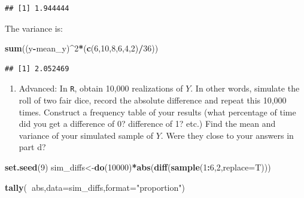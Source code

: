 \documentclass[
]{book}
\newenvironment{Shaded}{\begin{snugshade}}{\end{snugshade}}
\newcommand{\DataTypeTok}[1]{\textcolor[rgb]{0.13,0.29,0.53}{#1}}
\newcommand{\DecValTok}[1]{\textcolor[rgb]{0.00,0.00,0.81}{#1}}
\newcommand{\KeywordTok}[1]{\textcolor[rgb]{0.13,0.29,0.53}{\textbf{#1}}}
\newcommand{\NormalTok}[1]{#1}
\newcommand{\OperatorTok}[1]{\textcolor[rgb]{0.81,0.36,0.00}{\textbf{#1}}}
\newcommand{\StringTok}[1]{\textcolor[rgb]{0.31,0.60,0.02}{#1}}
\providecommand{\tightlist}{%
  \setlength{\itemsep}{0pt}\setlength{\parskip}{0pt}}
\begin{document}
\begin{verbatim}
## [1] 1.944444
\end{verbatim}

The variance is:

\begin{Shaded}
\begin{Highlighting}[]
\KeywordTok{sum}\NormalTok{((y}\OperatorTok{-}\NormalTok{mean_y)}\OperatorTok{^}\DecValTok{2}\OperatorTok{*}\NormalTok{(}\KeywordTok{c}\NormalTok{(}\DecValTok{6}\NormalTok{,}\DecValTok{10}\NormalTok{,}\DecValTok{8}\NormalTok{,}\DecValTok{6}\NormalTok{,}\DecValTok{4}\NormalTok{,}\DecValTok{2}\NormalTok{)}\OperatorTok{/}\DecValTok{36}\NormalTok{))}
\end{Highlighting}
\end{Shaded}

\begin{verbatim}
## [1] 2.052469
\end{verbatim}

\begin{enumerate}
\def\labelenumi{\alph{enumi}.}
\setcounter{enumi}{4}
\tightlist
\item
  Advanced: In \texttt{R}, obtain 10,000 realizations of \(Y\). In other words, simulate the roll of two fair dice, record the absolute difference and repeat this 10,000 times. Construct a frequency table of your results (what percentage of time did you get a difference of 0? difference of 1? etc.) Find the mean and variance of your simulated sample of \(Y\). Were they close to your answers in part d?
\end{enumerate}

\begin{Shaded}
\begin{Highlighting}[]
\KeywordTok{set.seed}\NormalTok{(}\DecValTok{9}\NormalTok{)}
\NormalTok{sim_diffs<-}\KeywordTok{do}\NormalTok{(}\DecValTok{10000}\NormalTok{)}\OperatorTok{*}\KeywordTok{abs}\NormalTok{(}\KeywordTok{diff}\NormalTok{(}\KeywordTok{sample}\NormalTok{(}\DecValTok{1}\OperatorTok{:}\DecValTok{6}\NormalTok{,}\DecValTok{2}\NormalTok{,}\DataTypeTok{replace=}\NormalTok{T)))}
\end{Highlighting}
\end{Shaded}

\begin{Shaded}
\begin{Highlighting}[]
\KeywordTok{tally}\NormalTok{(}\OperatorTok{~}\NormalTok{abs,}\DataTypeTok{data=}\NormalTok{sim_diffs,}\DataTypeTok{format=}\StringTok{"proportion"}\NormalTok{)}
\end{Highlighting}
\end{Shaded}
\end{document}
